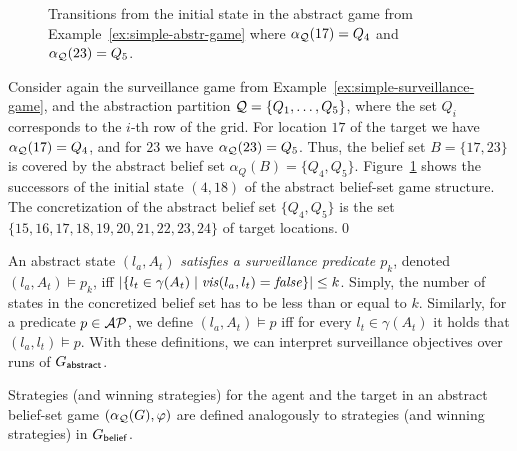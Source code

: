 \begin{figure}


\caption{Transitions from the initial state in the abstract game from Example~\ref{ex:simple-abstr-game} where $\alpha_{\mathcal{Q}}(17) = Q_4$ and $\alpha_{\mathcal{Q}}(23) = Q_5$.}
\label{fig:simple-abstr-game}

\end{figure}


\begin{example}\label{ex:simple-abstr-game}
Consider again the surveillance game from Example~\ref{ex:simple-surveillance-game}, and the abstraction partition $\mathcal{Q} = \{Q_1,\ldots,Q_5\}$, where the set $Q_i$ corresponds to the $i$-th row of the grid. For location $17$ of the target we have $\alpha_{\mathcal{Q}}(17) = Q_4$, and for  $23$ we have $\alpha_{\mathcal{Q}}(23) = Q_5$. Thus, the belief set $B = \{17,23\}$ is covered by the abstract belief set $\alpha_Q(B) = \{Q_4,Q_5\}$. Figure~\ref{fig:simple-abstr-game} shows the successors of the initial state $(4,18)$ of the abstract belief-set game structure. The concretization of the abstract belief set $\{Q_4,Q_5\}$ is the set $\{15,16,17,18,19,20,21,22,23,24\}$ of target locations.\qed
\end{example}

An abstract state $(l_a,A_t)$ \emph{satisfies a surveillance predicate $p_k$}, denoted $(l_a,A_t) \models p_k$, iff 
$|\{l_t \in \gamma(A_t) \mid \mathit{vis}(l_a,l_t)  = \mathit{false} \}| \leq k$. Simply, the number of states in the concretized belief set has to be less than or equal to $k$. Similarly, for a predicate $p \in \mathcal{AP}$, we define $(l_a,A_t) \models p$ iff for every $l_t \in \gamma(A_t)$ it holds that $(l_a,l_t) \models p$. With these definitions, we can interpret surveillance objectives over runs of $G_{\mathsf{abstract}}$.

Strategies (and winning strategies) for the agent and the target in an abstract belief-set game $(\alpha_{\mathcal{Q}}(G),\varphi)$ are defined analogously to strategies (and winning strategies) in $G_{\mathsf{belief}}$.